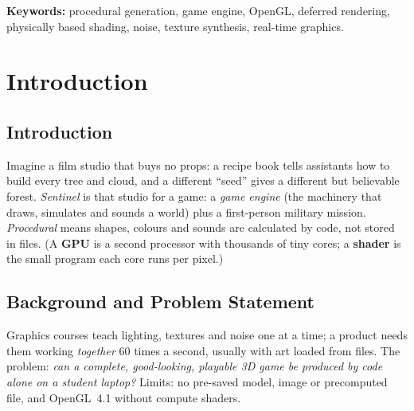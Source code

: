 \documentclass[12pt,a4paper,oneside]{report}
\begin{document}
\textbf{Keywords:} procedural generation, game engine, OpenGL, deferred rendering, physically based shading, noise, texture synthesis, real-time graphics.

\clearpage
{}
{}
{\footnotesize\tableofcontents}

\clearpage
{}
{}
{\let\clearpage\relax\let\cleardoublepage\relax\listoftables\listoffigures}

\clearpage
{}
\setcounter{page}{1}

\chapter{Introduction}

\section{Introduction}
Imagine a film studio that buys no props: a recipe book tells assistants how to build every tree and cloud, and a different ``seed'' gives a different but believable forest. \textit{Sentinel} is that studio for a game: a \emph{game engine} (the machinery that draws, simulates and sounds a world) plus a first-person military mission. \emph{Procedural} means shapes, colours and sounds are calculated by code, not stored in files. (A \textbf{GPU} is a second processor with thousands of tiny cores; a \textbf{shader} is the small program each core runs per pixel.)


\section{Background and Problem Statement}
Graphics courses teach lighting, textures and noise one at a time; a product needs them working \emph{together} 60 times a second, usually with art loaded from files. The problem: \emph{can a complete, good-looking, playable 3D game be produced by code alone on a student laptop?} Limits: no pre-saved model, image or precomputed file, and OpenGL~4.1 without compute shaders.
\end{document}
